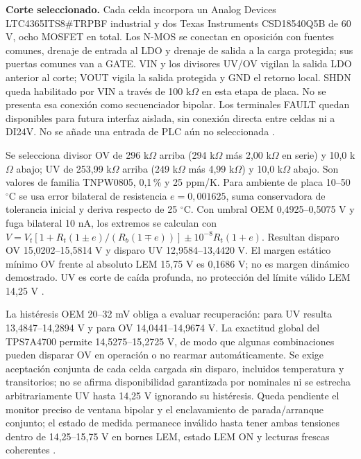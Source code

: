 \textbf{Corte seleccionado.} Cada celda incorpora un Analog Devices LTC4365ITS8\#TRPBF industrial y dos Texas Instruments CSD18540Q5B de 60 V, ocho MOSFET en total. Los N-MOS se conectan en oposición con fuentes comunes, drenaje de entrada al LDO y drenaje de salida a la carga protegida; sus puertas comunes van a GATE. VIN y los divisores UV/OV vigilan la salida LDO anterior al corte; VOUT vigila la salida protegida y GND el retorno local. SHDN queda habilitado por VIN a través de 100 k$\Omega$ en esta etapa de placa. No se presenta esa conexión como secuenciador bipolar. Los terminales FAULT quedan disponibles para futura interfaz aislada, sin conexión directa entre celdas ni a DI24V. No se añade una entrada de PLC aún no seleccionada \parencites[pp.~2--4 y 7--10]{lote41-ltc}[pp.~1--3]{lote41-mos}.

Se selecciona divisor OV de 296 k$\Omega$ arriba (294 k$\Omega$ más 2,00 k$\Omega$ en serie) y 10,0 k$\Omega$ abajo; UV de 253,99 k$\Omega$ arriba (249 k$\Omega$ más 4,99 k$\Omega$) y 10,0 k$\Omega$ abajo. Son valores de familia TNPW0805, 0,1\,\% y 25 ppm/K. Para ambiente de placa 10--50 $^\circ$C se usa error bilateral de resistencia $e=0,001625$, suma conservadora de tolerancia inicial y deriva respecto de 25 $^\circ$C. Con umbral OEM 0,4925--0,5075 V y fuga bilateral 10 nA, los extremos se calculan con $V=V_t[1+R_t(1\pm e)/(R_b(1\mp e))]\pm10^{-8}R_t(1+e)$. Resultan disparo OV 15,0202--15,5814 V y disparo UV 12,9584--13,4420 V. El margen estático mínimo OV frente al absoluto LEM 15,75 V es 0,1686 V; no es margen dinámico demostrado. UV es corte de caída profunda, no protección del límite válido LEM 14,25 V \parencites[p.~4]{lote41-ltc}[pp.~1--3]{lote41-tnpw}[p.~5]{lote35-lem200}.

La histéresis OEM 20--32 mV obliga a evaluar recuperación: para UV resulta 13,4847--14,2894 V y para OV 14,0441--14,9674 V. La exactitud global del TPS7A4700 permite 14,5275--15,2725 V, de modo que algunas combinaciones pueden disparar OV en operación o no rearmar automáticamente. Se exige aceptación conjunta de cada celda cargada sin disparo, incluidos temperatura y transitorios; no se afirma disponibilidad garantizada por nominales ni se estrecha arbitrariamente UV hasta 14,25 V ignorando su histéresis. Queda pendiente el monitor preciso de ventana bipolar y el enclavamiento de parada/arranque conjunto; el estado de medida permanece inválido hasta tener ambas tensiones dentro de 14,25--15,75 V en bornes LEM, estado LEM ON y lecturas frescas coherentes \parencites[pp.~3--4]{lote41-ltc}[p.~6]{lote38-positive}[pp.~5,8,10]{lote35-lem200}.

